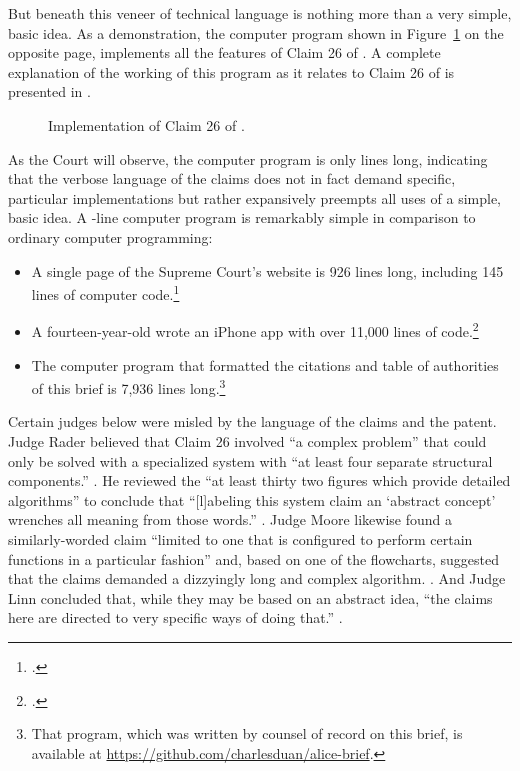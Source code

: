 \documentclass{scotus}
\begin{document}
But beneath this veneer
of technical language is nothing more than a very simple, basic idea. As a
demonstration, the computer program shown in Figure~\ref{code-listing}
on the opposite page,
implements all the features of Claim 26 of .
A complete explanation of the working of
this program as it relates to Claim 26 of  is presented in
.

\def\floatpagefraction{.1}
\begin{figure}[p]
\inlinebox{\wholeprogram}%
\baselineskip
\caption{Implementation of Claim 26 of \protect{}.}
\label{code-listing}
\end{figure}

As the Court will observe, the computer program is only \numlines lines long,
indicating that
the verbose language of the claims does not in fact demand specific, particular
implementations but rather expansively preempts all uses of a simple, basic
idea. A \numlines-line computer program is remarkably simple in comparison to
ordinary computer programming:
\begin{itemize}
\item A single page of the Supreme Court's website is 926 lines long, including
145 lines of computer code.\footnote{.}
\item A fourteen-year-old wrote an iPhone app with over 11,000 lines of
code.\footnote{.}
\item The computer program that formatted the citations
and table of authorities of this brief is 7,936 lines long.\footnote{That
program, which was written by counsel of record on this brief, is available at
\url{https://github.com/charlesduan/alice-brief}.}
\end{itemize}

Certain
judges below were misled by the language of the
claims and the patent.
Judge Rader believed that Claim 26 involved
``a complex problem'' that could only be solved with a specialized system
with ``at least four separate structural components.'' . He reviewed the ``at least thirty two figures
which
provide detailed algorithms'' to conclude that ``[l]abeling
this system claim an `abstract concept' wrenches all meaning from those words.''
. Judge Moore likewise found a
similarly-worded claim ``limited to one that is configured to perform certain
functions in a particular fashion'' and, based on one of the
flowcharts, suggested that the claims demanded a dizzyingly long
and complex algorithm. . And Judge Linn
concluded that, while they may be based
on an abstract idea, ``the claims here are directed to very specific ways of
doing that.''
.
\end{document}
